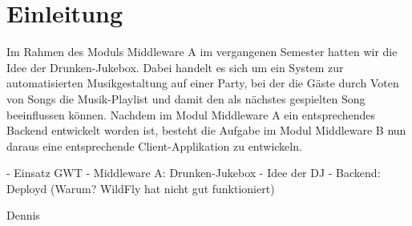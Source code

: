\section{Einleitung}
Im Rahmen des Moduls Middleware A im vergangenen Semester hatten wir die Idee der Drunken-Jukebox. Dabei handelt es sich um ein System zur automatisierten Musikgestaltung auf einer Party, bei der die Gäste durch Voten von Songs die Musik-Playlist und damit den als nächstes gespielten Song beeinflussen können. Nachdem im Modul Middleware A ein entsprechendes Backend entwickelt worden ist, besteht die Aufgabe im Modul Middleware B nun daraus eine entsprechende Client-Applikation zu entwickeln.

- Einsatz GWT
- Middleware A: Drunken-Jukebox
- Idee der DJ
- Backend: Deployd (Warum? WildFly hat nicht gut funktioniert)

Dennis